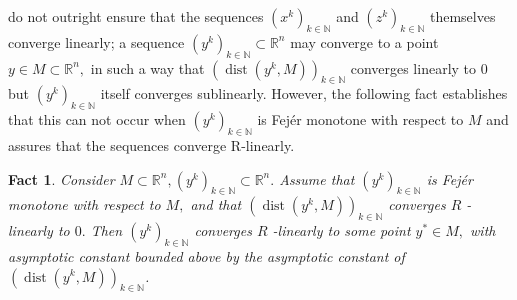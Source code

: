 \documentclass[smallextended,numbook,nospthms]{svjour3}
\theoremstyle{plain}
\newtheorem{fact}[theorem]{Fact}
\theoremstyle{definition}
\def\RR{\mathds R}
\def\NN{\mathds N}
\DeclareMathOperator{\dist}{dist}
\begin{document}
 do not outright ensure that the sequences $\left(x^{k}\right)_{k \in \NN}$ and $\left(z^{k}\right)_{k \in \NN}$ themselves converge linearly; a sequence $\left(y^{k}\right)_{k \in \NN} \subset \RR^{n}$ may converge to a point $y \in M \subset \RR^{n},$ in such a way that $\left(\dist\left(y^{k}, M\right)\right)_{k \in \NN}$ converges linearly to 0 but $\left(y^{k}\right)_{k \in \NN}$ itself converges sublinearly. However, the following fact establishes that this can not occur when $\left(y^{k}\right)_{k \in \NN}$ is Fejér monotone with respect to $M$ and assures that the sequences converge R-linearly.

\begin{fact}\label{fact:lemma EB conv}
	Consider $M \subset \RR^{n},\left(y^{k}\right)_{k \in \NN} \subset \RR^{n} .$ Assume that $\left(y^{k}\right)_{k \in \NN}$ is Fejér monotone with respect to $M,$ and that $\left(\operatorname{dist}\left(y^{k}, M\right)\right)_{k \in \NN}$ converges $R$ -linearly to $0 .$ Then $\left(y^{k}\right)_{k \in \NN}$ converges $R$ -linearly to some point $y^{*} \in M,$ with asymptotic constant bounded above by the asymptotic constant of $\left(\operatorname{dist}\left(y^{k}, M\right)\right)_{k \in \NN}$.
\end{fact}
\end{document}
